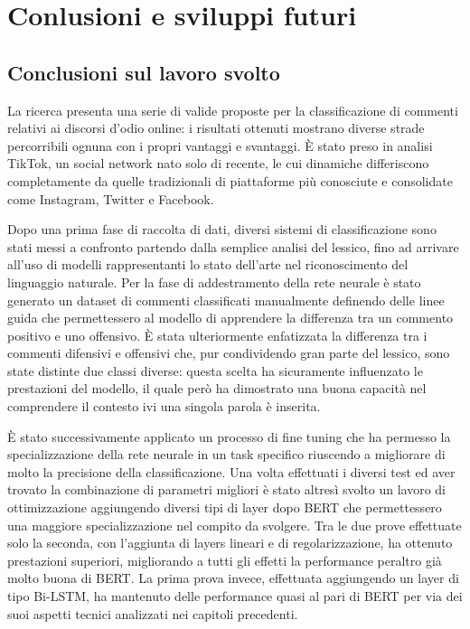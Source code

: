 \chapter{Conlusioni e sviluppi futuri}
\hspace{0,5cm} 
\section{Conclusioni sul lavoro svolto}

La ricerca presenta una serie di valide proposte per la classificazione di commenti relativi ai discorsi d'odio online: i risultati ottenuti mostrano diverse strade percorribili ognuna con i propri vantaggi e svantaggi. È stato preso in analisi TikTok, un social network nato solo di recente, le cui dinamiche differiscono completamente da quelle tradizionali di piattaforme più conosciute e consolidate come Instagram, Twitter e Facebook. 


Dopo una prima fase di raccolta di dati, diversi sistemi di classificazione sono stati messi a confronto partendo dalla semplice analisi del lessico, fino ad arrivare all'uso di modelli rappresentanti lo stato dell'arte nel riconoscimento del linguaggio naturale.
Per la fase di addestramento della rete neurale è stato generato un dataset di commenti classificati manualmente definendo delle linee guida che permettessero al modello di apprendere la differenza tra un commento positivo e uno offensivo. È stata ulteriormente enfatizzata la differenza tra i commenti difensivi e offensivi che, pur condividendo gran parte del lessico, sono state distinte due classi diverse: questa scelta ha sicuramente influenzato le prestazioni del modello, il quale però ha dimostrato una buona capacità nel comprendere il contesto ivi una singola parola è inserita.

È stato successivamente applicato un processo di fine tuning che ha permesso la specializzazione della rete neurale in un task specifico riuscendo a migliorare di molto la precisione della classificazione. Una volta effettuati i diversi test ed aver trovato la combinazione di parametri migliori è stato altresì svolto un lavoro di ottimizzazione aggiungendo diversi tipi di layer dopo BERT che permettessero una maggiore specializzazione nel compito da svolgere. Tra le due prove effettuate solo la seconda, con l'aggiunta di layers lineari e di regolarizzazione, ha ottenuto prestazioni superiori, migliorando a tutti gli effetti la performance peraltro già molto buona di BERT. La prima prova invece, effettuata aggiungendo un layer di tipo Bi-LSTM, ha mantenuto delle performance quasi al pari di BERT per via dei suoi aspetti tecnici analizzati nei capitoli precedenti.


